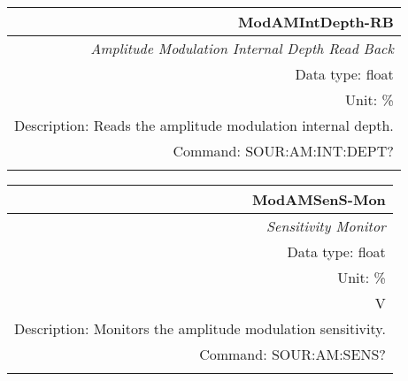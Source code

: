 \documentclass[openany]{article}
\begin{document}
		\begin{tabular}{N}
			\hline
			\bfseries ModAMIntDepth-RB \\ \hline
			\emph{Amplitude Modulation Internal Depth Read Back} \\
			Data type: float \\
			Unit: \% \\
			Description: Reads the amplitude modulation internal depth. \\
			Command: SOUR:AM:INT:DEPT? \\
			\\

		\end{tabular}


		\begin{tabular}{N}
			\hline
			\bfseries ModAMSenS-Mon \\ \hline
			\emph{Sensitivity Monitor} \\
			Data type: float \\
			Unit: \%\\V \\
			Description: Monitors the amplitude modulation sensitivity. \\
			Command: SOUR:AM:SENS? \\
			\\

		\end{tabular}
\end{document}
